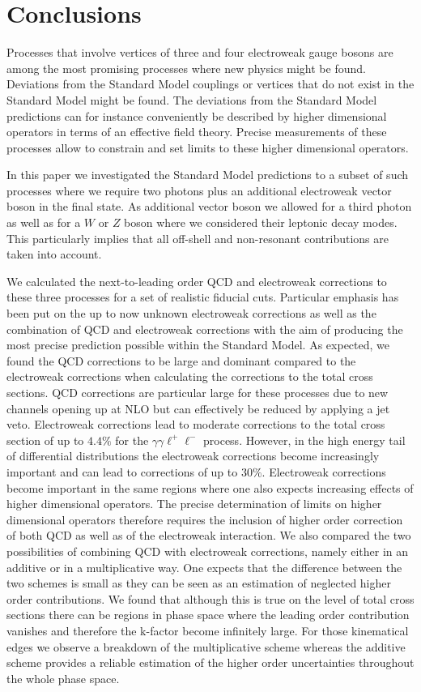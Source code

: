 \section{Conclusions}
\label{sec:conclusions}
Processes that involve vertices of three and four electroweak gauge bosons are among the most promising processes
where new physics might be found. Deviations from the Standard Model couplings or vertices that do not exist in the 
Standard Model might be found. The deviations from the Standard Model predictions can for instance conveniently be 
described by higher dimensional operators in terms of an effective field theory. Precise measurements of these  
processes allow to constrain and set limits to these higher dimensional operators.

In this paper we investigated the Standard Model predictions to a subset of such processes where we require
two photons plus an additional electroweak vector boson in the final state.  As additional vector boson we allowed
for a third photon as well as for a $W$ or $Z$ boson where we considered their leptonic decay modes.
This particularly implies that all off-shell and non-resonant contributions are taken into account.

We calculated the next-to-leading order QCD and electroweak corrections to these three processes for a set
of realistic fiducial cuts. Particular
emphasis has been put on the up to now unknown electroweak corrections as well as the combination of QCD and
electroweak corrections with the aim of producing the most precise prediction possible within the Standard Model.
As expected, we found the QCD corrections to be large and dominant compared to the electroweak corrections when 
calculating the corrections to the total cross sections. QCD corrections are particular large for these processes due to new
channels opening up at NLO but can effectively be reduced by applying a jet veto. Electroweak corrections
lead to moderate corrections to the total cross section of up to $4.4\%$ for the $\gamma\gamma \ell^{+}\ell^{-}$ 
process. However, in the high energy tail of differential distributions the electroweak corrections become increasingly important
and can lead to corrections of up to $30 \%$. Electroweak corrections become important in the same regions where one
also expects increasing effects of higher dimensional operators. The precise determination of limits on higher dimensional 
operators therefore requires the inclusion of higher order correction of both QCD as well as of the electroweak interaction.
We also compared the two possibilities of combining QCD with electroweak corrections, namely either in an additive or
in a multiplicative way. One expects that the difference between the two schemes is small as they can be seen as an estimation
of neglected higher order contributions. We found that although this is true on the level of total cross sections there can be 
regions in phase space where the leading order contribution vanishes and therefore the k-factor become infinitely large. 
For those kinematical edges we observe a breakdown of the multiplicative scheme whereas the additive scheme provides
a reliable estimation of the higher order uncertainties throughout the whole phase space.




